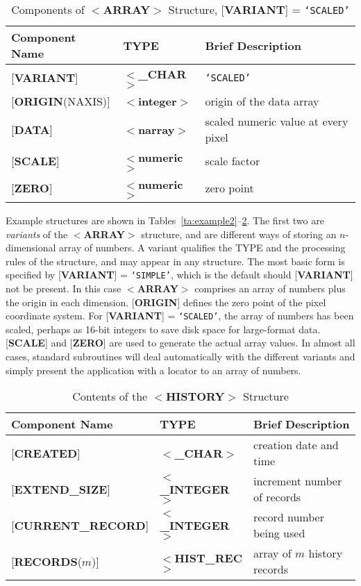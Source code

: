 \documentclass[twoside,11pt]{article}
\begin{document}
\begin{table}[htb]
\centering
\caption{Components of $<${\bf ARRAY}$>$ Structure,
{[}{\bf VARIANT}{]} = {\tt `SCALED'}}
\label{ta:example3}
\begin{tabular}{|l|l|l|}
\hline
Component Name & TYPE & Brief Description \\ \hline
{[}{\bf VARIANT}{]} & $<${\bf \_CHAR}$>$ & {\tt `SCALED'} \\
{[}{\bf ORIGIN}(NAXIS){]} & $<${\bf integer}$>$ & origin of the data array \\
{[}{\bf DATA}{]} & $<${\bf narray}$>$ & scaled numeric value at every pixel \\
{[}{\bf SCALE}{]} & $<${\bf numeric}$>$ & scale factor \\
{[}{\bf ZERO}{]} & $<${\bf numeric}$>$ & zero point \\ \hline
\end{tabular}
\end{table}

Example structures are shown in
Tables~\ref{ta:example2}--\ref{ta:example4}.
The first two are {\it variants} of the $<${\bf ARRAY}$>$
structure, and are different ways of storing an $n$-dimensional array of
numbers.  A variant qualifies the TYPE and the processing rules of the
structure, and may appear in any structure.  The most basic form is
specified by
{[}{\bf VARIANT}{]} = {\tt `SIMPLE'}, which is the default should
{[}{\bf VARIANT}{]} not be
present. In this case $<${\bf ARRAY}$>$ comprises an
array of numbers plus the origin in each
dimension. {[}{\bf ORIGIN}{]} defines the zero point of the
pixel coordinate system. For {[}{\bf VARIANT}{]} = {\tt `SCALED'},
the array of numbers has been
scaled, perhaps as 16-bit integers to save disk space for large-format
data.  {[}{\bf SCALE}{]} and {[}{\bf ZERO}{]} are used to generate the
actual array values. 
In almost all cases, standard subroutines will deal automatically
with the different variants and
simply present the application with a locator to an array of numbers. 

\begin{table}[htb]
\centering
\caption{Contents of the $<${\bf HISTORY}$>$ Structure}
\label{ta:example4}
\begin{tabular}{|l|l|l|}
\hline
Component Name & TYPE & Brief Description \\ \hline
{[}{\bf CREATED}{]} & $<${\bf \_CHAR}$>$ & creation date and time \\
{[}{\bf EXTEND\_SIZE}{]} & $<${\bf \_INTEGER}$>$ & increment number of records \\
{[}{\bf CURRENT\_RECORD}{]} & $<${\bf \_INTEGER}$>$ & record number being used \\
{[}{\bf RECORDS}($m$){]} & $<${\bf HIST\_REC}$>$ & array of $m$ history records \\ \hline
\end{tabular}
\end{table}
\end{document}
